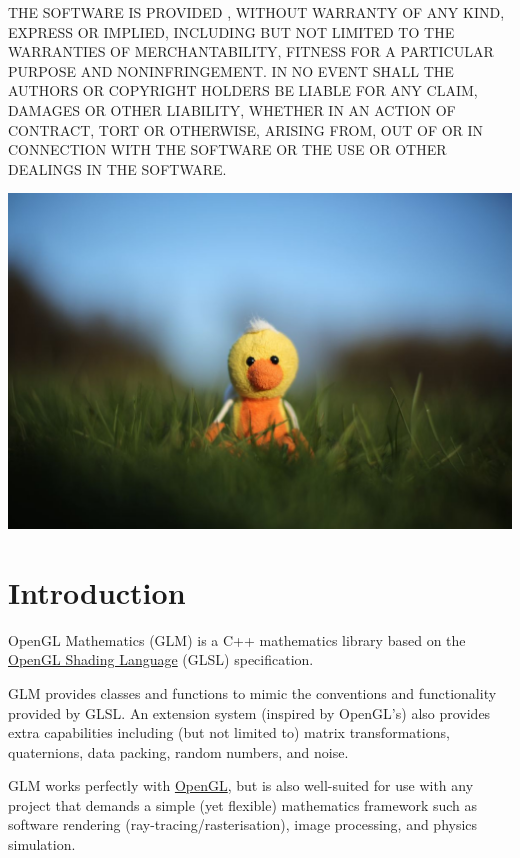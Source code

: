 \documentclass{scrartcl}
\numberwithin{figure}{subsection}
\begin{document}
THE SOFTWARE IS PROVIDED , WITHOUT WARRANTY OF ANY KIND, EXPRESS OR IMPLIED, INCLUDING BUT NOT LIMITED TO THE WARRANTIES OF MERCHANTABILITY, FITNESS FOR A PARTICULAR PURPOSE AND NONINFRINGEMENT. IN NO EVENT SHALL THE AUTHORS OR COPYRIGHT HOLDERS BE LIABLE FOR ANY CLAIM, DAMAGES OR OTHER LIABILITY, WHETHER IN AN ACTION OF CONTRACT, TORT OR OTHERWISE, ARISING FROM, OUT OF OR IN CONNECTION WITH THE SOFTWARE OR THE USE OR OTHER DEALINGS IN THE SOFTWARE.

\begin{center}
    \includegraphics[width=\textwidth]{duck-large2}
\end{center}

\pagebreak{}

\tableofcontents{}

\newpage{}

\section*{Introduction}

OpenGL Mathematics (GLM) is a C++ mathematics library based on the \href{https://www.opengl.org/documentation/glsl/}{OpenGL Shading Language} (GLSL) specification.

GLM provides classes and functions to mimic the conventions and functionality provided by GLSL.  An extension system (inspired by OpenGL's) also provides extra capabilities including (but not limited to) matrix transformations, quaternions, data packing, random numbers, and noise.

GLM works perfectly with \href{http://www.opengl.org}{OpenGL}, but is also well-suited for use with any project that demands a simple (yet flexible) mathematics framework such as software rendering (ray-tracing/rasterisation), image processing, and physics simulation.
\end{document}
